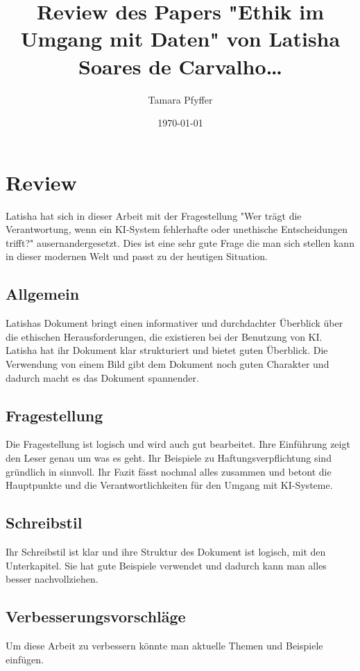 \documentclass{article}
\title{Review des Papers "Ethik im Umgang mit Daten" von Latisha Soares de Carvalho\dots}
\author{Tamara Pfyffer}
\date{\today}
\begin{document}
\maketitle


\chapter{Review}
Latisha hat sich in dieser Arbeit mit der Fragestellung "Wer trägt die Verantwortung, wenn ein KI-System fehlerhafte oder unethische Entscheidungen trifft?" ausernandergesetzt. Dies ist eine sehr gute Frage die man sich stellen kann in dieser modernen Welt und passt zu der heutigen Situation.

\section{Allgemein}
Latishas Dokument bringt einen informativer und durchdachter Überblick über die ethischen Herausforderungen, die existieren bei der Benutzung von KI. Latisha hat ihr Dokument klar strukturiert und bietet guten Überblick. Die Verwendung von einem Bild gibt dem Dokument noch guten Charakter und dadurch macht es das Dokument spannender.

\section{Fragestellung}
Die Fragestellung ist logisch und wird auch gut bearbeitet. Ihre Einführung zeigt den Leser genau um was es geht. Ihr Beispiele zu Haftungsverpflichtung sind gründlich in sinnvoll. Ihr Fazit fässt nochmal alles zusammen und betont die Hauptpunkte und die Verantwortlichkeiten für den Umgang mit KI-Systeme.

\section{Schreibstil}
Ihr Schreibstil ist klar und ihre Struktur des Dokument ist logisch, mit den Unterkapitel. Sie hat gute Beispiele verwendet und dadurch kann man alles besser nachvollziehen.

\section{Verbesserungsvorschläge}
Um diese Arbeit zu verbessern könnte man aktuelle Themen und Beispiele einfügen.

\printbibliography
\end{document}
